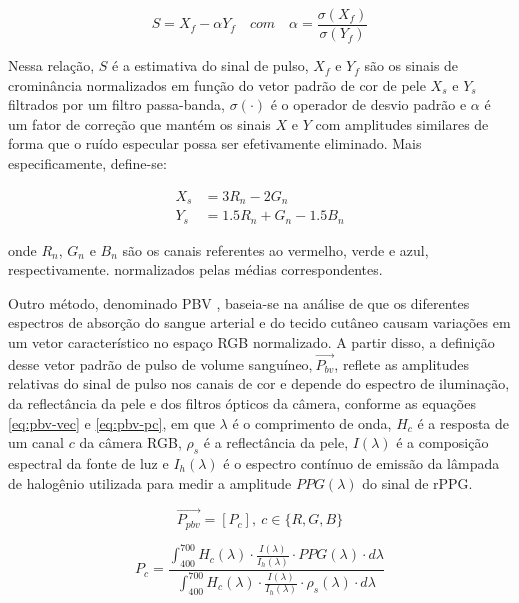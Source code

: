 \begin{equation}
\label{eq:chrom}
    S = X_f - \alpha Y_f \quad com \quad \alpha =  \frac{\sigma(X_f)}{\sigma(Y_f)}
\end{equation}

Nessa relação, \(S\) é a estimativa do sinal de pulso, \(X_f\) e \(Y_f\) são os sinais de crominância normalizados em função do vetor padrão de cor de pele \(X_s\) e \(Y_s\) filtrados por um filtro passa-banda, \( \sigma(\cdot) \) é o operador de desvio padrão e \( \alpha \) é um fator de correção que mantém os sinais \(X \) e \(Y \) com amplitudes similares de forma que o ruído especular possa ser efetivamente eliminado. Mais especificamente, define-se:

\begin{equation}
\begin{aligned} 
    X_s &= 3 R_n - 2 G_n \\
    Y_s &= 1.5 R_n + G_n - 1.5 B_n
\end{aligned}
\end{equation}

onde \(R_n\), \(G_n\) e \(B_n\) são os canais referentes ao vermelho, verde e azul, respectivamente. normalizados pelas médias correspondentes.

Outro método, denominado PBV \cite{de2014improved}, baseia-se na análise de que os diferentes espectros de absorção do sangue arterial e do tecido cutâneo causam variações em um vetor característico no espaço RGB normalizado. A partir disso, a definição desse vetor padrão de pulso de volume sanguíneo,\(\ \vec{P_{bv}}\), reflete as amplitudes relativas do sinal de pulso nos canais de cor e depende do espectro de iluminação, da reflectância da pele e dos filtros ópticos da câmera, conforme as equações \ref{eq:pbv-vec} e \ref{eq:pbv-pc}, em que \( \lambda \) é o comprimento de onda, \( H_c \) é a resposta de um canal \(c\) da câmera RGB, \( \rho_s \) é a reflectância da pele, \( I(\lambda) \) é a composição espectral da fonte de luz e \( I_h(\lambda) \) é o espectro contínuo de emissão da lâmpada de halogênio utilizada para medir a amplitude \( PPG(\lambda) \) do sinal de rPPG.

\begin{equation}
    \label{eq:pbv-vec}
    \vec{P_{pbv}}  = [ P_c], \:  c \in \{ R, G, B \}
\end{equation}

\begin{equation}
\label{eq:pbv-pc}
     P_{c} =  \frac{ \int_{400}^{700} H_c(\lambda) \cdot \frac{I(\lambda)}{I_h(\lambda)} \cdot PPG(\lambda) \cdot d \lambda }{ \int_{400}^{700} H_c(\lambda) \cdot \frac{I(\lambda)}{I_h(\lambda)} \cdot \rho_s(\lambda) \cdot d \lambda } 
\end{equation}

